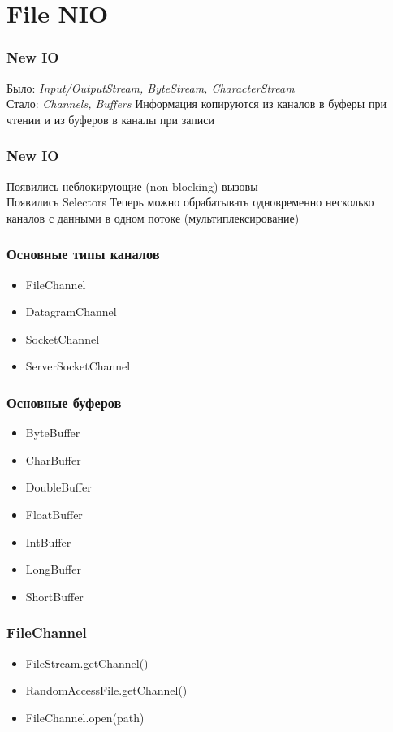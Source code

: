\documentclass[russian,aspectratio=169,14pt]{beamer}
\begin{document}
\section{File NIO}

\begin{frame}
	\frametitle{New IO}
	Было: \textit{Input/OutputStream, ByteStream, CharacterStream}\\
	Стало: \textit{Channels, Buffers}
	\vfill
	Информация копируются из каналов в буферы при чтении и из буферов в каналы при записи
\end{frame}

\begin{frame}
	\frametitle{New IO}
	Появились неблокирующие (non-blocking) вызовы\\
	Появились Selectors
	\vfill
	Теперь можно обрабатывать одновременно несколько каналов с данными в одном потоке (мультиплексирование)
\end{frame}

\begin{frame}
	\frametitle{Основные типы каналов}
	\begin{itemize}
		\item FileChannel
		\item DatagramChannel
		\item SocketChannel
		\item ServerSocketChannel
	\end{itemize}
\end{frame}

\begin{frame}
	\frametitle{Основные буферов}
	\begin{itemize}
		\item ByteBuffer
		\item CharBuffer
		\item DoubleBuffer
		\item FloatBuffer
		\item IntBuffer
		\item LongBuffer
		\item ShortBuffer
	\end{itemize}
\end{frame}

\begin{frame}
	\frametitle{FileChannel}
	\begin{itemize}
		\item FileStream.getChannel()
		\item RandomAccessFile.getChannel()
		\item FileChannel.open(path)
	\end{itemize}
\end{frame}
\end{document}
